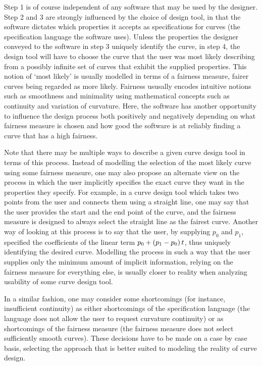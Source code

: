 \documentclass[a4paper]{article}
\begin{document}
			Step 1 is of course independent of any software that may be used by the designer. Step 2 and 3 are strongly influenced by the choice of design tool, in that the software dictates which properties it accepts as specifications for curves (the specification language the software uses). Unless the properties the designer conveyed to the software in step 3 uniquely identify the curve, in step 4, the design tool will have to choose the curve that the user was most likely describing from a possibly infinite set of curves that exhibit the supplied properties. This notion of `most likely' is usually modelled in terms of a fairness measure, fairer curves being regarded as more likely. Fairness ususally encodes intuitive notions such as smoothness and minimality using mathematical concepts such as continuity and variation of curvature. Here, the software has another opportunity to influence the design process both positively and negatively depending on what fairness measure is chosen and how good the software is at reliably finding a curve that has a high fairness.

			Note that there may be multiple ways to describe a given curve design tool in terms of this process. Instead of modelling the selection of the most likely curve using some fairness measure, one may also propose an alternate view on the process in which the user implicitly specifies the exact curve they want in the properties they specify. For example, in a curve design tool which takes two points from the user and connects them using a straight line, one may say that the user provides the start and the end point of the curve, and the fairness measure is designed to always select the straight line as the fairest curve. Another way of looking at this process is to say that the user, by supplying \(p_0\) and \(p_1\), specified the coefficients of the linear term \(p_0 + \left( p_1 - p_0 \right) t\), thus uniquely identifying the desired curve. Modelling the process in such a way that the user supplies only the minimum amount of implicit information, relying on the fairness measure for everything else, is usually closer to reality when analyzing usability of some curve design tool.

			In a similar fashion, one may consider some shortcomings (for instance, insufficient continuity) as either shortcomings of the specification language (the language does not allow the user to request curvature continuity) or as shortcomings of the fairness measure (the fairness measure does not select sufficiently smooth curves). These decisions have to be made on a case by case basis, selecting the approach that is better suited to modeling the reality of curve design.
\end{document}
